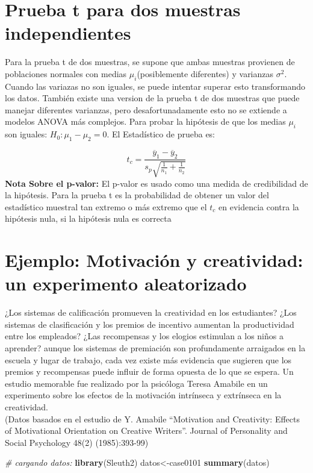 \documentclass[]{book}
\newenvironment{Shaded}{\begin{snugshade}}{\end{snugshade}}
\newcommand{\KeywordTok}[1]{\textcolor[rgb]{0.13,0.29,0.53}{\textbf{#1}}}
\newcommand{\CommentTok}[1]{\textcolor[rgb]{0.56,0.35,0.01}{\textit{#1}}}
\newcommand{\NormalTok}[1]{#1}
\begin{document}
\section{Prueba t para dos muestras
independientes}\label{prueba-t-para-dos-muestras-independientes}

Para la prueba t de dos muestras, se supone que ambas muestras provienen
de poblaciones normales con medias \(\mu_i\)(posiblemente diferentes) y
varianzas \(\sigma^2\). Cuando las variazas no son iguales, se puede
intentar superar esto transformando los datos. También existe una
version de la prueba t de dos muestras que puede manejar diferentes
varianzas, pero desafortunadamente esto no se extiende a modelos ANOVA
más complejos. Para probar la hipótesis de que los medias \(\mu_i\) son
iguales: \(H_0:\mu_1 - \mu_2=0\). El Estadístico de prueba es:

\[t_c=\frac{\overline{y}_1-\overline{y}_2}{s_p\sqrt{\frac{1}{n_1}+\frac{1}{n_2}}}\]
\textbf{Nota Sobre el p-valor:} El p-valor es usado como una medida de
credibilidad de la hipótesis. Para la prueba t es la probabilidad de
obtener un valor del estadístico muestral tan extremo o más extremo que
el \(t_c\) en evidencia contra la hipótesis nula, si la hipótesis nula
es correcta

\section{Ejemplo: Motivación y creatividad: un experimento
aleatorizado}\label{ejemplo-motivacion-y-creatividad-un-experimento-aleatorizado}

¿Los sistemas de calificación promueven la creatividad en los
estudiantes? ¿Los sistemas de clasificación y los premios de incentivo
aumentan la productividad entre los empleados? ¿Las recompensas y los
elogios estimulan a los niños a aprender? aunque los sistemas de
premiación son profundamente arraigados en la escuela y lugar de
trabajo, cada vez existe más evidencia que sugieren que los premios y
recompensas puede influir de forma opuesta de lo que se espera. Un
estudio memorable fue realizado por la psicóloga Teresa Amabile en un
experimento sobre los efectos de la motivación intrínseca y extrínseca
en la creatividad.\\
(Datos basados en el estudio de Y. Amabile ``Motivation and Creativity:
Effects of Motivational Orientation on Creative Writers''. Journal of
Personality and Social Psychology 48(2) (1985):393-99)

\begin{Shaded}
\begin{Highlighting}[]
\CommentTok{# cargando datos:}
\KeywordTok{library}\NormalTok{(Sleuth2)}
\NormalTok{datos<-case0101}
\KeywordTok{summary}\NormalTok{(datos)}
\end{Highlighting}
\end{Shaded}
\end{document}
